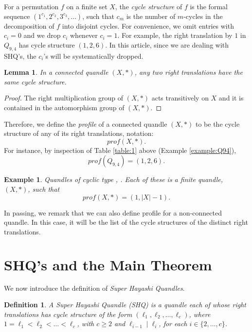 \documentclass{article}
\newtheorem{lemma}[theorem]{Lemma}
\newtheorem{definition}[theorem]{Definition}
\newtheorem{example}[theorem]{Example}
\begin{document}
For a permutation $f$ on a finite set $X$, the \emph{cycle structure} of $f$ is the formal sequence $(1^{c_1}, 2^{c_2}, 3^{c_3},\dots)$, such that $c_m$ is the number of $m$-cycles in the decomposition of $f$ into disjoint cycles. For convenience, we omit entries with $c_i=0$ and we drop $c_i$ whenever $c_i=1$. For example, the right translation by $1$ in $Q_{9,4}$ has cycle structure $(1, 2, 6)$. In this article, since we are dealing with SHQ's, the $c_i$'s will be systematically dropped.

\begin{lemma}\label{lem:connected}
In a connected quandle $(X,*)$, any two right translations have the same cycle structure.
\end{lemma}

\begin{proof}
The right multiplication group of $(X,*)$ acts transitively on $X$ and it is contained in the automorphism group of $(X,*)$.
\end{proof}

Therefore, we define the \emph{profile} of a connected quandle $(X,*)$ to be the cycle structure of any of its right translations, notation: $$prof(X,*) .$$For instance,  by inspection of Table \ref{table:1} above (Example \ref{example:Q94}), $$prof(Q_{9,4})=(1,2,6) .$$


\begin{example}\label{ex:qdlesCyclic}
Quandles of cyclic type \cite{Lopes_Roseman}, \cite{Vendramin_1}. Each of these is a finite quandle, $(X, *)$, such that $$prof(X, *)=(1, |X|-1) .$$
\end{example}

In passing, we remark that we can also define profile for a non-connected quandle. In this case, it will be the list of the cycle structures of the distinct right translations.

\section{SHQ's and the Main Theorem}\label{sctn:nested}

We now introduce the definition of \emph{Super Hayashi Quandles}.

\begin{definition}\label{def:nested}
A \emph{Super Hayashi Quandle} (SHQ) is a quandle each of whose right translations has cycle structure of the form $(\ell_1,\ell_2,\dots,\ell_c)$, where $1=\ell_1<\ell_2<\dots<\ell_c$, with $c\geq2$ and $\ell_{i-1}\mid\ell_i$, for each $i\in\{2,\dots,c\}$.
\end{definition}
\end{document}
